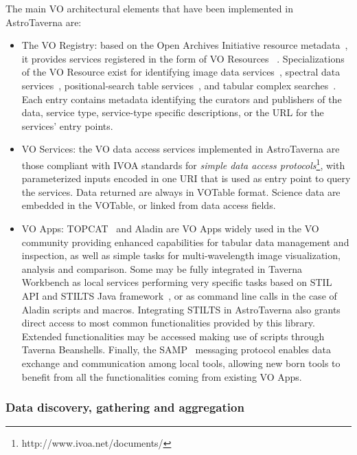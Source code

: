 \documentclass{aa}
\begin{document}
The main VO architectural elements that have been implemented in AstroTaverna are:

\begin{itemize}
\item The VO Registry: based on the Open Archives Initiative resource metadata~\citep{2002OAI-PMH},  it provides services registered in the form of VO Resources ~\citep{Hanisch2007}. Specializations of the VO Resource exist for identifying image data services~\citep[Simple Image Access Protocol;][]{Tody2009}, spectral data services~\citep[Simple Spectral Access Protocol;][]{Tody2012}, positional-search table services~\citep[ConeSearch Protocol;][]{Williams2008}, and tabular complex searches~\citep[Tabular Access Protocol;][]{Dowler2010}. Each entry contains metadata identifying the curators and publishers of the data, service type, service-type specific descriptions, or the URL for the services’ entry points. 

\item VO Services: the VO data access services implemented in AstroTaverna are those compliant with IVOA standards for \textit{simple data access protocols}\footnote{http://www.ivoa.net/documents/}, with parameterized inputs encoded in one URI that is used as entry point to query the services. Data returned are always in VOTable format. Science data are embedded in the VOTable, or linked from data access fields.

\item VO Apps: TOPCAT~\citep{Taylor2011} and Aladin are VO Apps widely used in the VO community providing enhanced capabilities for tabular data management and inspection, as well as simple tasks for multi-wavelength image visualization, analysis and comparison. Some may be fully integrated in Taverna Workbench as local services performing very specific tasks based on STIL API and STILTS Java framework~\citep{Taylor2006}, or as command line calls in the case of Aladin scripts and macros. Integrating STILTS in AstroTaverna also grants direct access to most common functionalities provided by this library. Extended functionalities may be accessed making use of scripts through Taverna Beanshells. Finally, the SAMP~\citep[Simple Application Messaging Protocol;][]{Taylor2012} messaging protocol enables data exchange and communication among local tools, allowing new born tools to benefit from all the functionalities coming from existing VO Apps.
\end{itemize}

\subsubsection{Data discovery, gathering and aggregation}
\label{DataDiscovery}
\end{document}
